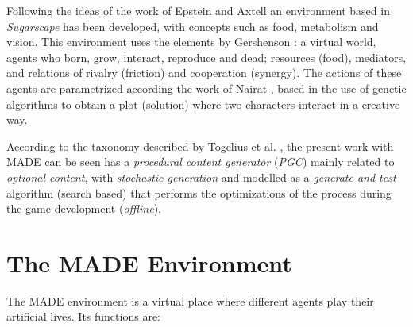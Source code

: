 \documentclass[runningheads]{llncs}
\begin{document}
Following the ideas of the work of Epstein and Axtell
\cite{epstein1996growing} an environment based in {\em Sugarscape} has
been developed, with concepts such as food, metabolism and
vision. This environment uses the elements by Gershenson
\cite{gershenson2005general}: a virtual world, agents who born, grow,
interact, reproduce and dead; resources (food), mediators, and
relations of rivalry (friction) and cooperation (synergy). The actions
of these agents are parametrized according the work of Nairat
\cite{nairat2011character}, based in the use of genetic algorithms to
obtain a plot (solution) where two characters interact in a creative way.

According to the taxonomy described by Togelius et al. \cite{Togelius2011}, the present work
with MADE can be seen has a \textit{procedural content generator} (\textit{PGC}) 
mainly related to \textit{optional content}, with \textit{stochastic generation} 
and modelled as a \textit{generate-and-test} algorithm (search based) that
performs the optimizations of the process during the game development (\textit{offline}).
  




\section{The MADE Environment}
\label{sec:made}

The MADE environment is a virtual place where different agents play their artificial lives. Its functions are:
\end{document}
